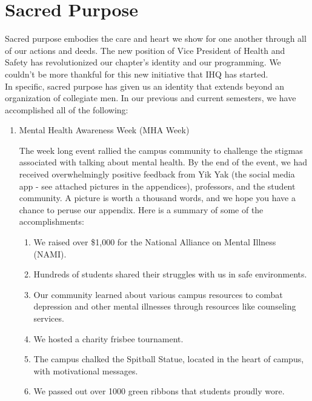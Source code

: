 \chapter{Sacred Purpose}

  Sacred purpose embodies the care and heart we show for one another through all of our actions and deeds. The new position of Vice President of Health and Safety has revolutionized our chapter's identity and our programming. We couldn't be more thankful for this new initiative that IHQ has started. \\

  In specific, sacred purpose has given us an identity that extends beyond an organization of collegiate men. In our previous and current semesters, we have accomplished all of the following:
  
  \begin{enumerate}
  	\item Mental Health Awareness Week (MHA Week)
  	
  	The week long event rallied the campus community to challenge the stigmas associated with talking about mental health. By the end of the event, we had received overwhelmingly positive feedback from Yik Yak (the social media app - see attached pictures in the appendices), professors, and the student community.  A picture is worth a thousand words, and we hope you have a chance to peruse our appendix. Here is a summary of some of the accomplishments:
  	
  	\begin{enumerate}
	      \item We raised over \$1,000 for the National Alliance on Mental Illness (NAMI).
  		
	      \item Hundreds of students shared their struggles with us in safe environments.
  		
	      \item Our community learned about various campus resources to combat depression and other mental illnesses through resources like counseling services.
	      
	      \item We hosted a charity frisbee tournament.
	      
	      \item The campus chalked the Spitball Statue, located in the heart of campus, with motivational messages.
	      
	      \item We passed out over 1000 green ribbons that students proudly wore.
	      

\end{enumerate}
\end{enumerate}
